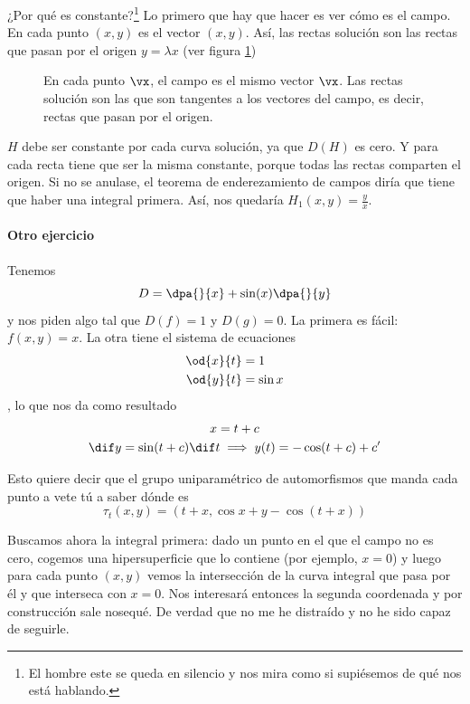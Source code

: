 ¿Por qué es constante?\footnote{El hombre este se queda en silencio y nos mira como si supiésemos de qué nos está hablando.} Lo primero que hay que hacer es ver cómo es el campo. En cada punto $(x,y)$ es el vector $(x,y)$. Así, las rectas solución son las rectas que pasan por el origen $y = λ x$ (ver figura \ref{imgCampoRadial})

\begin{figure}[hbtp]
\centering
{}
\caption{En cada punto $\vx$, el campo es el mismo vector $\vx$. Las rectas solución son las que son tangentes a los vectores del campo, es decir, rectas que pasan por el origen.}
\label{imgCampoRadial}
\end{figure}

$H$ debe ser constante por cada curva solución, ya que $D(H)$ es cero. Y para cada recta tiene que ser la misma constante, porque todas las rectas comparten el origen. Si no se anulase, el teorema de enderezamiento de campos diría que tiene que haber una integral primera. Así, nos quedaría $H_1(x,y) = \frac{y}{x}$.

\paragraph{Otro ejercicio} Tenemos \[ D = \dpa{}{x} + \sin(x) \dpa{}{y} \] y nos piden algo tal que $D(f) = 1$ y $D(g) = 0$. La primera es fácil: $f(x,y) = x$. La otra tiene el sistema de ecuaciones \begin{align*} \od{x}{t} &= 1 \\ \od{y}{t} &= \sin x \end{align*}, lo que nos da como resultado \begin{gather*}x = t + c \\ \dif y = \sin(t+c) \dif t \implies y(t) = - \cos(t + c) + c' \end{gather*}

Esto quiere decir que el grupo uniparamétrico de automorfismos que manda cada punto a vete tú a saber dónde es \[ τ_t(x,y) = \left(t+x, \cos x + y - \cos(t+x)\right)\]

Buscamos ahora la integral primera: dado un punto en el que el campo no es cero, cogemos una hipersuperficie que lo contiene (por ejemplo, $x=0$) y luego para cada punto $(x,y)$ vemos la intersección de la curva integral que pasa por él y que interseca con $x = 0$. Nos interesará entonces la segunda coordenada y por construcción sale nosequé. De verdad que no me he distraído y no he sido capaz de seguirle.

